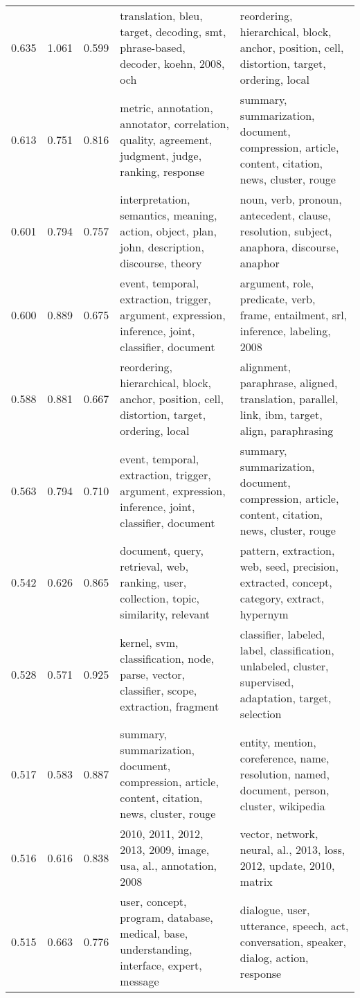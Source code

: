 \begin{tabular}{cccp{5cm}p{5cm}}
0.635 & 1.061 & 0.599 & translation, bleu, target, decoding, smt, phrase-based, decoder, koehn, 2008, och & reordering, hierarchical, block, anchor, position, cell, distortion, target, ordering, local \\
0.613 & 0.751 & 0.816 & metric, annotation, annotator, correlation, quality, agreement, judgment, judge, ranking, response & summary, summarization, document, compression, article, content, citation, news, cluster, rouge \\
0.601 & 0.794 & 0.757 & interpretation, semantics, meaning, action, object, plan, john, description, discourse, theory & noun, verb, pronoun, antecedent, clause, resolution, subject, anaphora, discourse, anaphor \\
0.600 & 0.889 & 0.675 & event, temporal, extraction, trigger, argument, expression, inference, joint, classifier, document & argument, role, predicate, verb, frame, entailment, srl, inference, labeling, 2008 \\
0.588 & 0.881 & 0.667 & reordering, hierarchical, block, anchor, position, cell, distortion, target, ordering, local & alignment, paraphrase, aligned, translation, parallel, link, ibm, target, align, paraphrasing \\
0.563 & 0.794 & 0.710 & event, temporal, extraction, trigger, argument, expression, inference, joint, classifier, document & summary, summarization, document, compression, article, content, citation, news, cluster, rouge \\
0.542 & 0.626 & 0.865 & document, query, retrieval, web, ranking, user, collection, topic, similarity, relevant & pattern, extraction, web, seed, precision, extracted, concept, category, extract, hypernym \\
0.528 & 0.571 & 0.925 & kernel, svm, classification, node, parse, vector, classifier, scope, extraction, fragment & classifier, labeled, label, classification, unlabeled, cluster, supervised, adaptation, target, selection \\
0.517 & 0.583 & 0.887 & summary, summarization, document, compression, article, content, citation, news, cluster, rouge & entity, mention, coreference, name, resolution, named, document, person, cluster, wikipedia \\
0.516 & 0.616 & 0.838 & 2010, 2011, 2012, 2013, 2009, image, usa, al., annotation, 2008 & vector, network, neural, al., 2013, loss, 2012, update, 2010, matrix \\
0.515 & 0.663 & 0.776 & user, concept, program, database, medical, base, understanding, interface, expert, message & dialogue, user, utterance, speech, act, conversation, speaker, dialog, action, response \\

\end{tabular}
